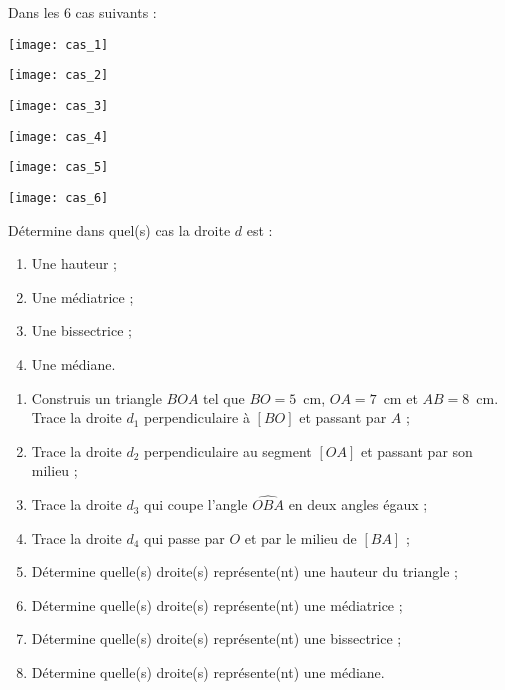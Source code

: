 \begin{exercice}
Dans les 6 cas suivants :
\begin{colenumerate}{3}
 \item
 
 \texttt{[image: cas\_1]}
 \item
 
 \texttt{[image: cas\_2]}
 \item
 
 \texttt{[image: cas\_3]}
 \item
 
 \texttt{[image: cas\_4]}
 \item
 
 \texttt{[image: cas\_5]}
 \item
 
 \texttt{[image: cas\_6]}
 \end{colenumerate}
Détermine dans quel(s) cas la droite $d$ est :
\begin{enumerate}
 \item Une hauteur ;
 \item Une médiatrice ;
 \item Une bissectrice ;
 \item Une médiane.
 \end{enumerate}
\end{exercice}


\begin{exercice}[Vocabulaire] \label{triangles_vocabulaire}
\begin{enumerate}
 \item Construis un triangle $BOA$ tel que $BO = 5$ cm, $OA = 7$ cm et $AB = 8$ cm. Trace la droite $d_1$ perpendiculaire à $[BO]$ et passant par $A$ ;
 \item Trace la droite $d_2$ perpendiculaire au segment $[OA]$ et passant par son milieu ;
 \item Trace la droite $d_3$ qui coupe l'angle $\widehat{OBA}$ en deux angles égaux ;
 \item Trace la droite $d_4$ qui passe par $O$ et par le milieu de $[BA]$ ;
 \item Détermine quelle(s) droite(s) représente(nt) une hauteur du triangle ;
 \item Détermine quelle(s) droite(s) représente(nt) une médiatrice ;
 \item Détermine quelle(s) droite(s) représente(nt) une bissectrice ;
 \item Détermine quelle(s) droite(s) représente(nt) une médiane.
 \end{enumerate}
\end{exercice}


